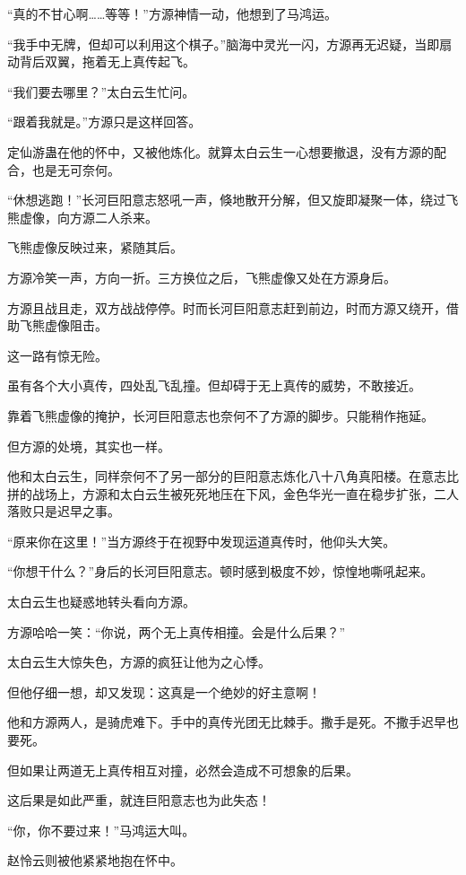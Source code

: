 \begin{this_body}
“真的不甘心啊……等等！”方源神情一动，他想到了马鸿运。

“我手中无牌，但却可以利用这个棋子。”脑海中灵光一闪，方源再无迟疑，当即扇动背后双翼，拖着无上真传起飞。

“我们要去哪里？”太白云生忙问。

“跟着我就是。”方源只是这样回答。

定仙游蛊在他的怀中，又被他炼化。就算太白云生一心想要撤退，没有方源的配合，也是无可奈何。

“休想逃跑！”长河巨阳意志怒吼一声，倏地散开分解，但又旋即凝聚一体，绕过飞熊虚像，向方源二人杀来。

飞熊虚像反映过来，紧随其后。

方源冷笑一声，方向一折。三方换位之后，飞熊虚像又处在方源身后。

方源且战且走，双方战战停停。时而长河巨阳意志赶到前边，时而方源又绕开，借助飞熊虚像阻击。

这一路有惊无险。

虽有各个大小真传，四处乱飞乱撞。但却碍于无上真传的威势，不敢接近。

靠着飞熊虚像的掩护，长河巨阳意志也奈何不了方源的脚步。只能稍作拖延。

但方源的处境，其实也一样。

他和太白云生，同样奈何不了另一部分的巨阳意志炼化八十八角真阳楼。在意志比拼的战场上，方源和太白云生被死死地压在下风，金色华光一直在稳步扩张，二人落败只是迟早之事。

“原来你在这里！”当方源终于在视野中发现运道真传时，他仰头大笑。

“你想干什么？”身后的长河巨阳意志。顿时感到极度不妙，惊惶地嘶吼起来。

太白云生也疑惑地转头看向方源。

方源哈哈一笑：“你说，两个无上真传相撞。会是什么后果？”

太白云生大惊失色，方源的疯狂让他为之心悸。

但他仔细一想，却又发现：这真是一个绝妙的好主意啊！

他和方源两人，是骑虎难下。手中的真传光团无比棘手。撒手是死。不撒手迟早也要死。

但如果让两道无上真传相互对撞，必然会造成不可想象的后果。

这后果是如此严重，就连巨阳意志也为此失态！

“你，你不要过来！”马鸿运大叫。

赵怜云则被他紧紧地抱在怀中。


\end{this_body}
